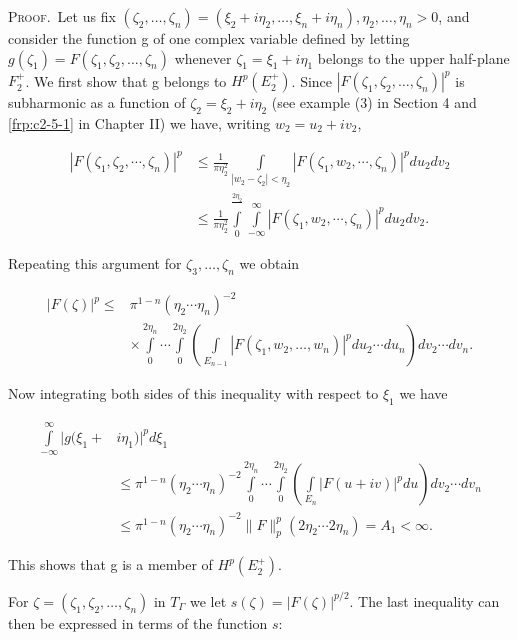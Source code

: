 \textsc{Proof.}\ Let us fix $(\zeta_2, \ldots, \zeta_n) = (\xi_2 + i\eta_2, \ldots, \xi_n + i\eta_n), \eta_2, \ldots, \eta_n > 0$, and consider the function g of one complex variable defined by letting $g(\zeta_1) = F(\zeta_1, \zeta_2, \ldots, \zeta_n)$ whenever $\zeta_1 = \xi_1 + i\eta_1$ belongs to the upper half-plane $F_2^+$. We first show that g belongs to $H^p(E_2^+)$. Since $|F(\zeta_1, \zeta_2, \ldots, \zeta_n)|^p$ is subharmonic as a function of $\zeta_2 = \xi_2 + i\eta_2$ (see example (3) in Section 4 and \eqref{frp:c2-5-1} in Chapter II) we have, writing $w_2 = u_2 + iv_2$,

\[
\begin{aligned}|F(\zeta_{1},\zeta_{2},\cdots,\zeta_{n})|^{p}&\leq\frac{1}{\pi\eta_{2}^{2}}\int\limits_{|w_{2}-\zeta_{2}|<\eta_{2}}|F(\zeta_{1},w_{2},\cdots,\zeta_{n})|^{p}du_{2}dv_{2}\\&\leq\frac{1}{\pi\eta_{2}^{2}}\int\limits_{0}^{\frac{2\eta_{2}}{}}\int\limits_{-\infty}^{\infty}|F(\zeta_{1},w_{2},\cdots,\zeta_{n})|^{p}du_{2}dv_{2}.\end{aligned}
\]

Repeating this argument for $\zeta_{3}, \ldots, \zeta_{n}$ we obtain

\[
\begin{aligned}|F(\zeta)|^{p}\leq&\pi^{1-n}(\eta_{2}\cdots\eta_{n})^{-2}\\&\times\int\limits_{0}^{2\eta_{n}}\cdots\int\limits_{0}^{2\eta_{2}}\left(\int\limits_{E_{n-1}}|F(\zeta_{1},w_{2},\ldots,w_{n})|^{p} du_{2}\cdots du_{n}\right)dv_{2}\cdots dv_{n}.\end{aligned}
\]

Now integrating both sides of this inequality with respect to $\xi_{1}$ we have

\[
\begin{aligned}\int\limits_{-\infty}^{\infty}|g(\xi_{1}+&i\eta_{1})|^{p}d\xi_{1}\\&\leq\pi^{1-n}(\eta_{2}\cdots\eta_{n})^{-2}\int\limits_{0}^{2\eta_{n}}\cdots\int\limits_{0}^{2\eta_{2}}\left(\int\limits_{E_{n}}|F(u+iv)|^{p}du\right)dv_{2}\cdots dv_{n}\\&\leq\pi^{1-n}(\eta_{2}\cdots\eta_{n})^{-2}\|F\|_{p}^{p}(2\eta_{2}\cdots2\eta_{n})=A_{1}<\infty.\end{aligned}
\]

This shows that g is a member of $H^{p}(E_{2}^{+})$.

For $\zeta = (\zeta_1, \zeta_2, \ldots, \zeta_n)$ in $T_\Gamma$ we let $s(\zeta) = |F(\zeta)|^{p/2}$. The last inequality can then be expressed in terms of the function $s$:

